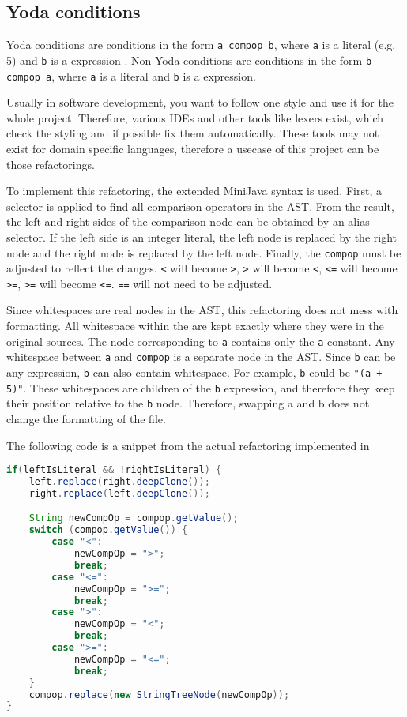 
\subsection{Yoda conditions}

Yoda conditions are conditions in the form \verb|a compop b|, where \verb|a| is a literal (e.g. 5) and \verb|b| is a expression \cite[page 71]{readable_code}.
Non Yoda conditions are conditions in the form \verb|b compop a|, where \verb|a| is a literal and \verb|b| is a expression.

Usually in software development, you want to follow one style and use it for the whole project. 
Therefore, various IDEs and other tools like lexers exist, which check
the styling and if possible fix them automatically. These tools may not exist for domain specific languages, 
therefore a usecase of this project can be those refactorings.

To implement this refactoring, the extended MiniJava syntax is used. 
First, a selector is applied to find all comparison operators in the AST.
From the result, the left and right sides of the comparison node can be obtained by an alias selector. 
If the left side is an integer literal, the left node is replaced by the right node and the right node is replaced by the left node.
Finally, the \verb|compop| must be adjusted to reflect the changes. 
\verb|<| will become \verb|>|, \verb|>| will become \verb|<|, \verb|<=| will become \verb|>=|, \verb|>=| will become \verb|<=|.
\verb|==| will not need to be adjusted.

Since whitespaces are real nodes in the AST, this refactoring does not mess with formatting. All whitespace within the
are kept exactly where they were in the original sources.
The node corresponding to \verb|a| contains only the \verb|a| constant. 
Any whitespace between \verb|a| and \verb|compop| is a separate node in the AST. 
Since \verb|b| can be any expression, \verb|b| can also contain whitespace. For example, \verb|b| could be \verb|"(a + 5)"|.
These whitespaces are children of the \verb|b| expression, and therefore they keep their position relative to the \verb|b| node.
Therefore, swapping a and b does not change the formatting of the file.

The following code is a snippet from the actual refactoring implemented in \cite{yoda_refactoring}

\begin{lstlisting}[language=Java, caption=Refactor Yoda conditions]
if(leftIsLiteral && !rightIsLiteral) {
    left.replace(right.deepClone());
    right.replace(left.deepClone());

    String newCompOp = compop.getValue();
    switch (compop.getValue()) {
        case "<":
            newCompOp = ">";
            break;
        case "<=":
            newCompOp = ">=";
            break;
        case ">":
            newCompOp = "<";
            break;
        case ">=":
            newCompOp = "<=";
            break;
    }
    compop.replace(new StringTreeNode(newCompOp));
}
\end{lstlisting}
